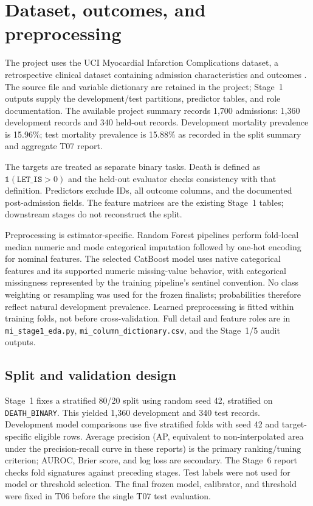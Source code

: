 \section{Dataset, outcomes, and preprocessing}
The project uses the UCI Myocardial Infarction Complications dataset, a retrospective clinical dataset containing admission characteristics and outcomes \cite{ucimi}. The source file and variable dictionary are retained in the project; Stage~1 outputs supply the development/test partitions, predictor tables, and role documentation. The available project summary records 1,700 admissions: 1,360 development records and 340 held-out records. Development mortality prevalence is 15.96\%; test mortality prevalence is 15.88\% as recorded in the split summary and aggregate T07 report.

The targets are treated as separate binary tasks. Death is defined as $\mathbb{1}(\texttt{LET\_IS}>0)$ and the held-out evaluator checks consistency with that definition. Predictors exclude IDs, all outcome columns, and the documented post-admission fields. The feature matrices are the existing Stage~1 tables; downstream stages do not reconstruct the split.

Preprocessing is estimator-specific. Random Forest pipelines perform fold-local median numeric and mode categorical imputation followed by one-hot encoding for nominal features. The selected CatBoost model uses native categorical features and its supported numeric missing-value behavior, with categorical missingness represented by the training pipeline's sentinel convention. No class weighting or resampling was used for the frozen finalists; probabilities therefore reflect natural development prevalence. Learned preprocessing is fitted within training folds, not before cross-validation. Full detail and feature roles are in \texttt{mi\_stage1\_eda.py}, \texttt{mi\_column\_dictionary.csv}, and the Stage~1/5 audit outputs.

\subsection{Split and validation design}
Stage~1 fixes a stratified 80/20 split using random seed 42, stratified on \texttt{DEATH\_BINARY}. This yielded 1,360 development and 340 test records. Development model comparisons use five stratified folds with seed 42 and target-specific eligible rows. Average precision (AP, equivalent to non-interpolated area under the precision-recall curve in these reports) is the primary ranking/tuning criterion; AUROC, Brier score, and log loss are secondary. The Stage~6 report checks fold signatures against preceding stages. Test labels were not used for model or threshold selection. The final frozen model, calibrator, and threshold were fixed in T06 before the single T07 test evaluation.
